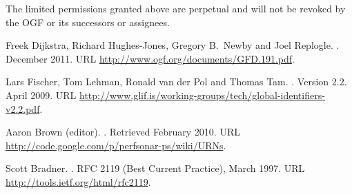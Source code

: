 \documentclass[12pt]{article}  %
\begin{document}
The limited permissions granted above are perpetual and will not be revoked by the OGF or its successors or assignees.


% 
\begin{thebibliography}{2}


Freek Dijkstra, Richard Hughes-Jones, Gregory B.\ Newby and Joel Replogle.
.
\newblock December 2011.
\newblock URL \url{http://www.ogf.org/documents/GFD.191.pdf}.

Lars Fischer, Tom Lehman, Ronald van der Pol and Thomas Tam.
.
\newblock Version 2.2. April 2009.
\newblock URL \url{http://www.glif.is/working-groups/tech/global-identifiers-v2.2.pdf}.


Aaron Brown (editor).
.
\newblock Retrieved February 2010.
\newblock URL \url{http://code.google.com/p/perfsonar-ps/wiki/URNs}.

Scott Bradner.
.
\newblock RFC 2119 (Best Current Practice), March 1997.
\newblock URL \url{http://tools.ietf.org/html/rfc2119}.


\end{thebibliography}
\end{document}
